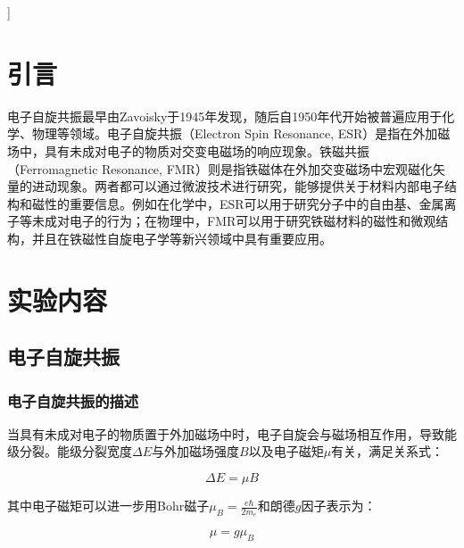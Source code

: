 \documentclass{thuemp}
\begin{document}
    ]
    \wuhao 
    
    \section{引言}
    \enlargethispage{-3.3cm}

    电子自旋共振最早由Zavoisky于1945年发现\cite{Zavoisky1945}，随后自1950年代开始被普遍应用于化学、物理等领域。电子自旋共振（Electron Spin Resonance, ESR）是指在外加磁场中，具有未成对电子的物质对交变电磁场的响应现象。铁磁共振（Ferromagnetic Resonance, FMR）则是指铁磁体在外加交变磁场中宏观磁化矢量的进动现象。两者都可以通过微波技术进行研究，能够提供关于材料内部电子结构和磁性的重要信息。例如在化学中，ESR可以用于研究分子中的自由基、金属离子等未成对电子的行为\cite{ESR_Chem_Review}；在物理中，FMR可以用于研究铁磁材料的磁性和微观结构，并且在铁磁性自旋电子学等新兴领域中具有重要应用\cite{FMR_Spintronics}。



    \section{实验内容}
    
    \subsection{电子自旋共振}
    
    \subsubsection{电子自旋共振的描述}
    
    当具有未成对电子的物质置于外加磁场中时，电子自旋会与磁场相互作用，导致能级分裂。能级分裂宽度$\Delta E$与外加磁场强度$B$以及电子磁矩$\mu$有关，满足关系式：
    
    \begin{equation}
    \Delta E = \mu B
    \end{equation}
    
    其中电子磁矩可以进一步用Bohr磁子$\mu_B = \frac{e\hbar}{2m_e}$和朗德$g$因子表示为：
    
    \begin{equation}
    \mu = g \mu_B
    \end{equation}
    
\end{document}
